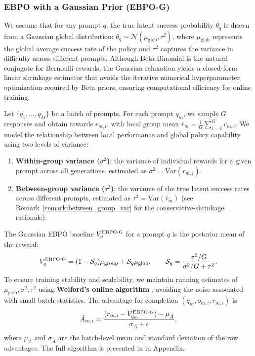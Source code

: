 \documentclass{article}
\theoremstyle{plain}
\theoremstyle{definition}
\theoremstyle{remark}
\newcommand{\oursG}{\textsc{EBPO-G}\xspace}
\begin{document}
\subsubsection{EBPO with a Gaussian Prior (\oursG)}
\label{sec:ebpo-gaussian}

We assume that for any prompt $q$, the true latent success probability $\theta_q$ is drawn from a Gaussian global distribution: $\theta_q \sim \mathcal{N}(\mu_{\text{glob}}, \tau^2)$, where $\mu_{\text{glob}}$ represents the global average success rate of the policy and $\tau^2$ captures the variance in difficulty across different prompts. Although Beta-Binomial is the natural conjugate for Bernoulli rewards, the Gaussian relaxation yields a closed-form linear shrinkage estimator that avoids the iterative numerical hyperparameter optimization required by Beta priors, ensuring computational efficiency for online training.

Let $\{q_1, \dots, q_M\}$ be a batch of prompts. For each prompt $q_m$, we sample $G$ responses and obtain rewards $r_{m,i}$, with local group mean $\bar{r}_m = \frac{1}{G} \sum_{i=1}^G r_{m,i}$. We model the relationship between local performance and global policy capability using two levels of variance:
\begin{enumerate}
   \item \textbf{Within-group variance ($\sigma^2$)}: the variance of individual rewards for a given prompt across all generations, estimated as $\sigma^2 = \text{Var}(r_{m,i})$.
   \item \textbf{Between-group variance ($\tau^2$)}: the variance of the true latent success rates across different prompts, estimated as $\tau^2 = \text{Var}(\bar{r}_m)$ (see Remark~\ref{remark:between_group_var} for the conservative-shrinkage rationale).
\end{enumerate}
The Gaussian EBPO baseline $V_q^{\oursG}$ for a prompt $q$ is the posterior mean of the reward:
\begin{equation}
    V_q^{\oursG} = (1 - \mathcal{S}_q) \mu_{\text{group}} + \mathcal{S}_q \mu_{\text{glob}}, \qquad
    \mathcal{S}_q = \frac{\sigma^2 / G}{\sigma^2 / G + \tau^2}.
    \label{eq:ebpo-gaussian}
\end{equation}
To ensure training stability and scalability, we maintain running estimates of $\mu_{\text{glob}}, \sigma^2, \tau^2$ using \textbf{Welford's online algorithm} \citep{welford1962note}, avoiding the noise associated with small-batch statistics. The advantage for completion $(q_m, o_{m,i}, r_{m,i})$ is
\begin{equation}
    \hat{A}_{m,i} = \frac{(r_{m,i} - V_{q_m}^{\oursG}) - \mu_{\hat{A}}}{\sigma_{\hat{A}} + \epsilon},
\end{equation}
where $\mu_{\hat{A}}$ and $\sigma_{\hat{A}}$ are the batch-level mean and standard deviation of the raw advantages. The full algorithm is presented in  in Appendix.
\end{document}
